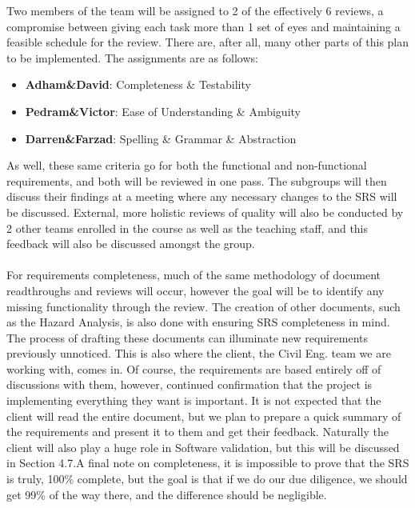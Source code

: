 \documentclass[12pt, titlepage]{article}
\begin{document}
Two members of the team will be assigned to 2 of the effectively 6 reviews, a compromise between giving each task more than 1 set of eyes and maintaining a feasible schedule
for the review. There are, after all, many other parts of this plan to be implemented. The assignments are as follows: 
\begin{itemize}
\item \textbf{Adham\&David}: Completeness \& Testability\\
\item \textbf{Pedram\&Victor}: Ease of Understanding \& Ambiguity\\
\item \textbf{Darren\&Farzad}: Spelling \& Grammar \& Abstraction\\
\end{itemize}
As well, these same criteria go for both the functional and non-functional requirements,
and both will be reviewed in one pass. The subgroups will then discuss their findings at a meeting where any necessary changes to the SRS will be discussed. External, 
more holistic reviews of quality will also be conducted by 2 other teams enrolled in the course as well as the teaching staff, and this feedback will also be discussed 
amongst the group.\\\\ For requirements completeness, much of the same methodology of document readthroughs and reviews will occur, however the goal will be to identify any 
missing functionality through the review. The creation of other documents, such as the Hazard Analysis, is also done with ensuring SRS completeness in mind. The process of 
drafting these documents can illuminate new requirements previously unnoticed. This is also where the client, the Civil Eng. team we are working with, comes in.
Of course, the requirements are based entirely off of discussions with them, however, continued confirmation that the project is implementing everything they want is important. 
It is not expected that the client will read the entire document, but we plan to prepare a quick summary of the requirements and present it to them and get their feedback.
Naturally the client will also play a huge role in Software validation, but this will be discussed in Section 4.7.A final note on completeness, it is impossible to prove that the SRS is 
truly, 100\% complete, but the goal is that if we do our due diligence, we should get 99\% of the way there, and the difference should be negligible.\\\\
\end{document}
